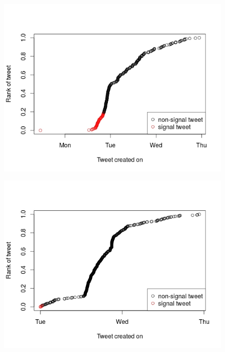  
 
\begin{figure}[H]
	\centering
	\begin{minipage}{.45\linewidth}
		\includegraphics[width=\linewidth]{images/rumor1.jpeg}
		\label{r1}
	\end{minipage}
	\hspace{.05\linewidth}
	\begin{minipage}{.45\linewidth}
		\includegraphics[width=\linewidth]{images/rumor2.jpeg}
		\label{r2}
	\end{minipage}

\end{figure}
